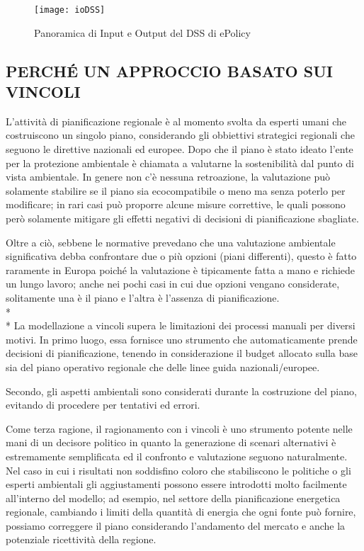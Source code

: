\documentclass[12pt,a4paper,openright,twoside]{report}
\begin{document}
\begin{figure}[h]
	\centering
	\texttt{[image: ioDSS]}
	\caption{Panoramica di Input e Output del DSS di ePolicy}
	\label{ioDSS}
\end{figure}

\subsection[APPROCCIO A VINCOLI]{\nohyphens{PERCHÉ UN APPROCCIO BASATO SUI VINCOLI}}
L'attività di pianificazione regionale è al momento svolta da esperti umani che costruiscono un singolo piano, considerando gli obbiettivi strategici regionali che seguono le direttive nazionali ed europee. Dopo che il piano è stato ideato l'ente per la protezione ambientale è chiamata a valutarne la sostenibilità dal punto di vista ambientale. In genere non c'è nessuna retroazione, la valutazione può solamente stabilire se il piano sia ecocompatibile o meno ma senza poterlo per modificare; in rari casi può proporre alcune misure correttive, le quali possono però solamente mitigare gli effetti negativi di decisioni di pianificazione sbagliate.

Oltre a ciò, sebbene le normative prevedano che una valutazione ambientale significativa debba confrontare due o più opzioni (piani differenti), questo è fatto raramente in Europa poiché la valutazione è tipicamente fatta a mano e richiede un lungo lavoro; anche nei pochi casi in cui due opzioni vengano considerate, solitamente una è il piano e l'altra è l'assenza di pianificazione.\\*\\*
La modellazione a vincoli supera le limitazioni dei processi manuali per diversi motivi. In primo luogo, essa fornisce uno strumento che automaticamente prende decisioni di pianificazione, tenendo in considerazione il budget allocato sulla base sia del piano operativo regionale che delle linee guida nazionali/europee.

Secondo, gli aspetti ambientali sono considerati durante la costruzione del piano, evitando di procedere per tentativi ed errori.

Come terza ragione, il ragionamento con i vincoli è uno strumento potente nelle mani di un decisore politico in quanto la generazione di scenari alternativi è estremamente semplificata ed il confronto e valutazione seguono naturalmente. Nel caso in cui i risultati non soddisfino coloro che stabiliscono le politiche o gli esperti ambientali gli aggiustamenti possono essere introdotti molto facilmente all'interno del modello; ad esempio, nel settore della pianificazione energetica regionale, cambiando i limiti della quantità di energia che ogni fonte può fornire, possiamo correggere il piano considerando l'andamento del mercato e anche la potenziale ricettività della regione.
\end{document}
